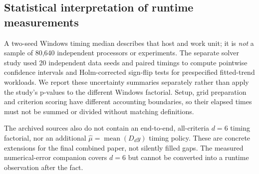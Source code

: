 \subsection{Statistical interpretation of runtime measurements}
A two-seed Windows timing median describes that host and work unit; it is \emph{not} a sample of 80,640 independent processors or experiments. The separate solver study used 20 independent data seeds and paired timings to compute pointwise confidence intervals and Holm-corrected sign-flip tests for prespecified fitted-trend workloads. We report these uncertainty summaries separately rather than apply the study's p-values to the different Windows factorial. Setup, grid preparation and criterion scoring have different accounting boundaries, so their elapsed times must not be summed or divided without matching definitions.

The archived sources also do not contain an end-to-end, all-criteria $d=6$ timing factorial, nor an additional $\widehat\mu=\operatorname{mean}(D_dy)$ timing policy. These are concrete extensions for the final combined paper, not silently filled gaps. The measured numerical-error companion covers $d=6$ but cannot be converted into a runtime observation after the fact.
